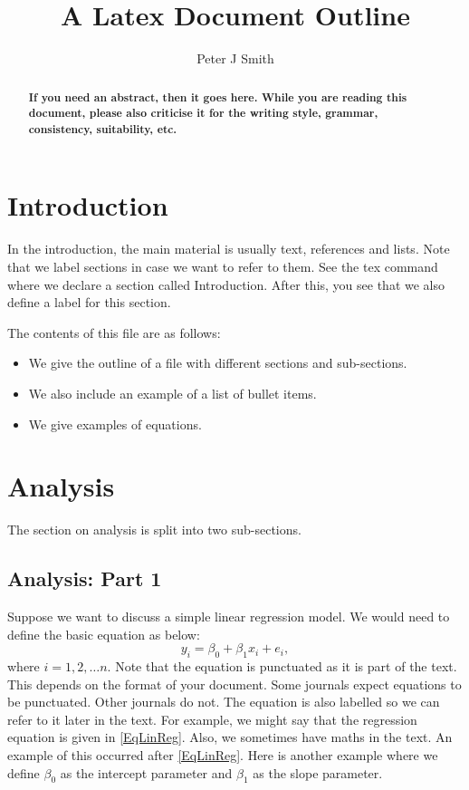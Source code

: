\documentclass[conference]{IEEEtran}
\begin{document}
\title{A Latex Document Outline}

\author{Peter J Smith}

\maketitle

\begin{abstract}
\textbf{If you need an abstract, then it goes here. While you are reading this document, please also criticise it for the writing style, grammar, consistency, suitability, etc. }
\end{abstract}

\section{Introduction}\label{intro}

In the introduction, the main material is usually text, references and lists. Note that we label sections in case we want to refer to them. See the tex command where we declare a section called Introduction. After this, you see that we also define a label for this section.

 The contents of this file are as follows: 
\begin{itemize}
\item We give the outline of a file with different sections and sub-sections. 
\item We also include an example of a list of bullet items.
\item We give examples of equations.
\end{itemize}

\section{Analysis}\label{analysis}
The section on analysis is split into two sub-sections. 
\subsection{Analysis: Part 1}\label{analysis1}
Suppose we want to discuss a simple linear regression model. We would need to define the basic equation as below:
\begin{equation}\label{EqLinReg}
y_i=\beta_0+\beta_1 x_i + e_i,
\end{equation}
where $i=1,2, \ldots n$. Note that the equation is punctuated as it is part of the text. This depends on the format of your document. Some journals expect equations to be punctuated. Other journals do not. The equation is also labelled so we can refer to it later in the text. For example, we might say that the regression equation is given in \eqref{EqLinReg}. Also, we sometimes have maths in the text. An example of this occurred after \eqref{EqLinReg}. Here is another example where we define $\beta_0$ as the intercept parameter and $\beta_1$ as the slope parameter. 
\end{document}
